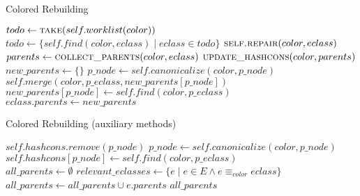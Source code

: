 \begin{algorithm}[t]
\caption{\label{functional:repair}
    Colored Rebuilding}
\begin{algorithmic}[1]
            \State $todo \gets \Call{take}{self.worklist(color)}$
            \State $todo \gets \{ self.find(color, eclass) \mid eclass \in todo \}$
                \State $\Call{self.repair}{color, eclass}$
            \EndFor
        \EndWhile
    \EndFor
\EndFunction
\\
    \State $parents \gets \Call{collect\_parents}{color, eclass}$
    \State $\Call{update\_hashcons}{color, parents}$
    \State $new\_parents \gets \{\}$
        \State $p\_node \gets self.canonicalize(color, p\_node)$
            \State $self.merge(color, p\_eclass, new\_parents[p\_node])$
            \State $new\_parents[p\_node] \gets self.find(color, p\_eclass)$
        \EndIf
    \EndFor
        \State $eclass.parents \gets new\_parents$
    \EndIf
\EndFunction
\end{algorithmic}
\end{algorithm}

\begin{algorithm}[t]
\caption{\label{functional:repair-aux}
    Colored Rebuilding (auxiliary methods)}
\begin{algorithmic}[1]
        \State $self.hashcons.remove(p\_node)$
        \State $p\_node \gets self.canonicalize(color, p\_node)$
        \State $self.hashcons[p\_node] \gets self.find(color, p\_eclass)$
    \EndFor
    \EndIf
\EndFunction
\\
    \State $all\_parents \gets \emptyset$ 
    \State $relevant\_eclasses \gets \{e \mid e \in E \land e \equiv_{color} eclass\}$
        \State $all\_parents \gets all\_parents \cup e.parents$ 
    \EndFor
    \State \Return $all\_parents$
\EndFunction
\end{algorithmic}
\end{algorithm}

